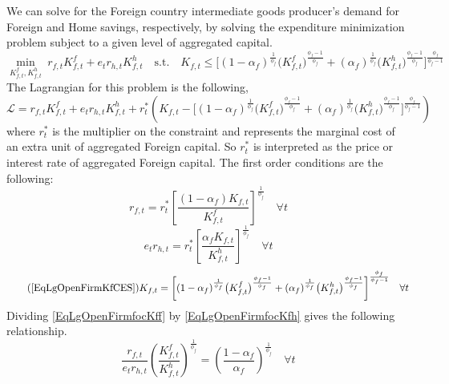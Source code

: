 \documentclass[letterpaper,12pt]{article}
\theoremstyle{definition}
\begin{document}
    We can solve for the Foreign country intermediate goods producer's demand for Foreign and Home savings, respectively, by solving the expenditure minimization problem subject to a given level of aggregated capital.
    \begin{equation}\label{EqLgOpenFirmMinProbF}
      \min_{K^f_{f,t},K^h_{f,t}} \: r_{f,t} K^f_{f,t} + e_t r_{h,t}K^h_{f,t} \quad \text{s.t.} \quad K_{f,t} \leq \biggl[(1 - \alpha_f)^\frac{1}{\phi_f}\bigl(K^f_{f,t}\bigr)^\frac{\phi_f-1}{\phi_f} + (\alpha_f)^\frac{1}{\phi_f}\bigl(K^h_{f,t}\bigr)^\frac{\phi_f-1}{\phi_f}\biggr]^\frac{\phi_f}{\phi_f-1}
    \end{equation}
    The Lagrangian for this problem is the following,
    \begin{equation}\label{EqLgOpenFirmlagrF}
      \mathcal{L} = r_{f,t}K^f_{f,t} + e_t r_{h,t}K^h_{f,t} + r^*_t\left(K_{f,t} - \biggl[(1 - \alpha_f)^\frac{1}{\phi_f}\bigl(K^f_{f,t}\bigr)^\frac{\phi_f-1}{\phi_f} + (\alpha_f)^\frac{1}{\phi_f}\bigl(K^h_{f,t}\bigr)^\frac{\phi_f-1}{\phi_f}\biggr]^\frac{\phi_f}{\phi_f-1}\right)
    \end{equation}
    where $r^*_t$ is the multiplier on the constraint and represents the marginal cost of an extra unit of aggregated Foreign capital. So $r^*_t$ is interpreted as the price or interest rate of aggregated Foreign capital. The first order conditions are the following:
    \begin{equation}\label{EqLgOpenFirmfocKff}
      r_{f,t} = r^*_t\left[\frac{(1-\alpha_f)K_{f,t}}{K^f_{f,t}}\right]^{\frac{1}{\phi_f}} \quad\forall t
    \end{equation}
    \begin{equation}\label{EqLgOpenFirmfocKfh}
      e_t r_{h,t} = r^*_t\left[\frac{\alpha_f K_{f,t}}{K^h_{f,t}}\right]^{\frac{1}{\phi_f}} \quad\forall t
    \end{equation}
    \begin{equation}\tag{\ref{EqLgOpenFirmKfCES}}
      K_{f,t}= \biggl[(1 - \alpha_f)^\frac{1}{\phi_f}\bigl(K^f_{f,t}\bigr)^\frac{\phi_f-1}{\phi_f} + (\alpha_f)^\frac{1}{\phi_f}\bigl(K^h_{f,t}\bigr)^\frac{\phi_f-1}{\phi_f}\biggr]^\frac{\phi_f}{\phi_f-1} \quad\forall t
    \end{equation}
    Dividing \eqref{EqLgOpenFirmfocKff} by \eqref{EqLgOpenFirmfocKfh} gives the following relationship.
    \begin{equation}\label{EqLgOpenFirmFracCapForDom}
      \frac{r_{f,t}}{e_t r_{h,t}}\left(\frac{K^f_{f,t}}{K^h_{f,t}}\right)^{\frac{1}{\phi_f}} = \left(\frac{1-\alpha_f}{\alpha_f}\right)^{\frac{1}{\phi_f}} \quad\forall t
    \end{equation}
\end{document}
